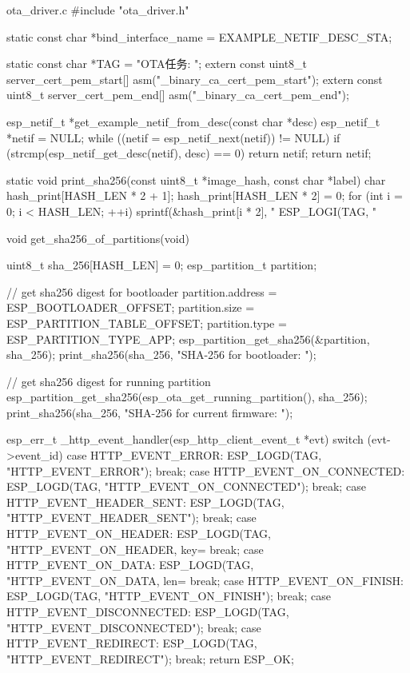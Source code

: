 \documentclass[lang=cn,newtx,10pt,scheme=chinese]{elegantbook}
\begin{document}
\begin{mycode}{ota\_driver.c}
#include "ota_driver.h"

static const char *bind_interface_name = EXAMPLE_NETIF_DESC_STA;

static const char *TAG = "OTA任务: ";
extern const uint8_t server_cert_pem_start[] asm("_binary_ca_cert_pem_start");
extern const uint8_t server_cert_pem_end[] asm("_binary_ca_cert_pem_end");

esp_netif_t *get_example_netif_from_desc(const char *desc)
{
    esp_netif_t *netif = NULL;
    while ((netif = esp_netif_next(netif)) != NULL)
    {
        if (strcmp(esp_netif_get_desc(netif), desc) == 0)
        {
            return netif;
        }
    }
    return netif;
}

static void print_sha256(const uint8_t *image_hash, const char *label)
{
    char hash_print[HASH_LEN * 2 + 1];
    hash_print[HASH_LEN * 2] = 0;
    for (int i = 0; i < HASH_LEN; ++i)
    {
        sprintf(&hash_print[i * 2], "%
    }
    ESP_LOGI(TAG, "%
}

void get_sha256_of_partitions(void)
{
    uint8_t sha_256[HASH_LEN] = {0};
    esp_partition_t partition;

    // get sha256 digest for bootloader
    partition.address = ESP_BOOTLOADER_OFFSET;
    partition.size = ESP_PARTITION_TABLE_OFFSET;
    partition.type = ESP_PARTITION_TYPE_APP;
    esp_partition_get_sha256(&partition, sha_256);
    print_sha256(sha_256, "SHA-256 for bootloader: ");

    // get sha256 digest for running partition
    esp_partition_get_sha256(esp_ota_get_running_partition(), sha_256);
    print_sha256(sha_256, "SHA-256 for current firmware: ");
}

esp_err_t _http_event_handler(esp_http_client_event_t *evt)
{
    switch (evt->event_id)
    {
    case HTTP_EVENT_ERROR:
        ESP_LOGD(TAG, "HTTP_EVENT_ERROR");
        break;
    case HTTP_EVENT_ON_CONNECTED:
        ESP_LOGD(TAG, "HTTP_EVENT_ON_CONNECTED");
        break;
    case HTTP_EVENT_HEADER_SENT:
        ESP_LOGD(TAG, "HTTP_EVENT_HEADER_SENT");
        break;
    case HTTP_EVENT_ON_HEADER:
        ESP_LOGD(TAG, "HTTP_EVENT_ON_HEADER, key=%
        break;
    case HTTP_EVENT_ON_DATA:
        ESP_LOGD(TAG, "HTTP_EVENT_ON_DATA, len=%
        break;
    case HTTP_EVENT_ON_FINISH:
        ESP_LOGD(TAG, "HTTP_EVENT_ON_FINISH");
        break;
    case HTTP_EVENT_DISCONNECTED:
        ESP_LOGD(TAG, "HTTP_EVENT_DISCONNECTED");
        break;
    case HTTP_EVENT_REDIRECT:
        ESP_LOGD(TAG, "HTTP_EVENT_REDIRECT");
        break;
    }
    return ESP_OK;
}


\end{mycode}
\end{document}
